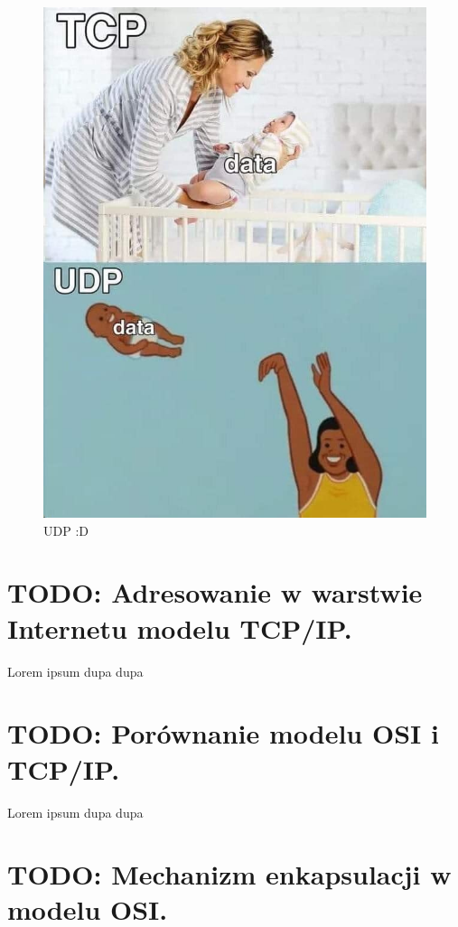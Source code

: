 \documentclass[a4paper,12pt,oneside]{book}
\begin{document}
		\begin{figure}[h!]
			\centering\includegraphics[scale=0.35]{udp.jpg}
			\caption{UDP :D}
		\end{figure}
		
		\setcounter{section}{9}
		\section{\color{red} TODO: Adresowanie w warstwie Internetu modelu TCP/IP.}
		
		Lorem ipsum dupa dupa
		
		\setcounter{section}{11}
		\section{\color{red} TODO: Porównanie modelu OSI i TCP/IP. }
		
		Lorem ipsum dupa dupa
		
		\setcounter{section}{12}
		\section{\color{red} TODO: Mechanizm enkapsulacji w modelu OSI. }
		
\end{document}
